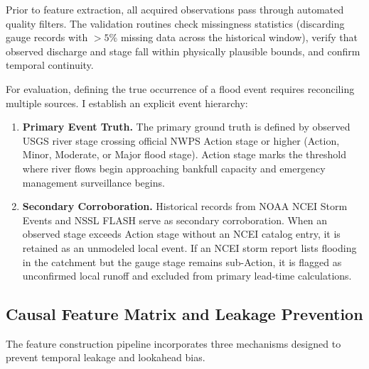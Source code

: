 \documentclass[12pt]{report}
\begin{document}
Prior to feature extraction, all acquired observations pass through automated quality filters. The validation routines check missingness statistics (discarding gauge records with $>5\%$ missing data across the historical window), verify that observed discharge and stage fall within physically plausible bounds, and confirm temporal continuity.

For evaluation, defining the true occurrence of a flood event requires reconciling multiple sources. I establish an explicit event hierarchy:
\begin{enumerate}
  \item \textbf{Primary Event Truth.} The primary ground truth is defined by observed USGS river stage crossing official NWPS Action stage or higher (Action, Minor, Moderate, or Major flood stage). Action stage marks the threshold where river flows begin approaching bankfull capacity and emergency management surveillance begins.
  \item \textbf{Secondary Corroboration.} Historical records from NOAA NCEI Storm Events and NSSL FLASH serve as secondary corroboration. When an observed stage exceeds Action stage without an NCEI catalog entry, it is retained as an unmodeled local event. If an NCEI storm report lists flooding in the catchment but the gauge stage remains sub-Action, it is flagged as unconfirmed local runoff and excluded from primary lead-time calculations.
\end{enumerate}

\subsection{Causal Feature Matrix and Leakage Prevention}

The feature construction pipeline incorporates three mechanisms designed to prevent temporal leakage and lookahead bias.
\end{document}
